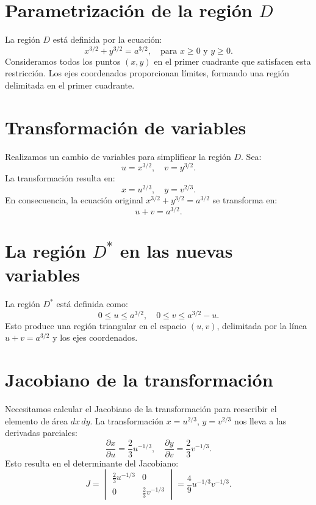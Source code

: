 \section*{Parametrización de la región \( D \)}

La región \( D \) está definida por la ecuación:
\[
x^{3/2} + y^{3/2} = a^{3/2}, \quad \text{para } x \geq 0 \text{ y } y \geq 0.
\]
Consideramos todos los puntos \( (x, y) \) en el primer cuadrante que satisfacen esta restricción. Los ejes coordenados proporcionan límites, formando una región delimitada en el primer cuadrante.

\section*{Transformación de variables}

Realizamos un cambio de variables para simplificar la región \( D \). Sea:
\[
u = x^{3/2}, \quad v = y^{3/2}.
\]
La transformación resulta en:
\[
x = u^{2/3}, \quad y = v^{2/3}.
\]
En consecuencia, la ecuación original \( x^{3/2} + y^{3/2} = a^{3/2} \) se transforma en:
\[
u + v = a^{3/2}.
\]

\section*{La región \( D^* \) en las nuevas variables}

La región \( D^* \) está definida como:
\[
0 \leq u \leq a^{3/2}, \quad 0 \leq v \leq a^{3/2} - u.
\]
Esto produce una región triangular en el espacio \( (u, v) \), delimitada por la línea \( u + v = a^{3/2} \) y los ejes coordenados.

\section*{Jacobiano de la transformación}

Necesitamos calcular el Jacobiano de la transformación para reescribir el elemento de área \( dx \, dy \). La transformación \( x = u^{2/3}, \, y = v^{2/3} \) nos lleva a las derivadas parciales:
\[
\frac{\partial x}{\partial u} = \frac{2}{3} u^{-1/3}, \quad
\frac{\partial y}{\partial v} = \frac{2}{3} v^{-1/3}.
\]
Esto resulta en el determinante del Jacobiano:
\[
J = \begin{vmatrix}
\frac{2}{3} u^{-1/3} & 0 \\
0 & \frac{2}{3} v^{-1/3}
\end{vmatrix} = \frac{4}{9} u^{-1/3} v^{-1/3}.
\]

